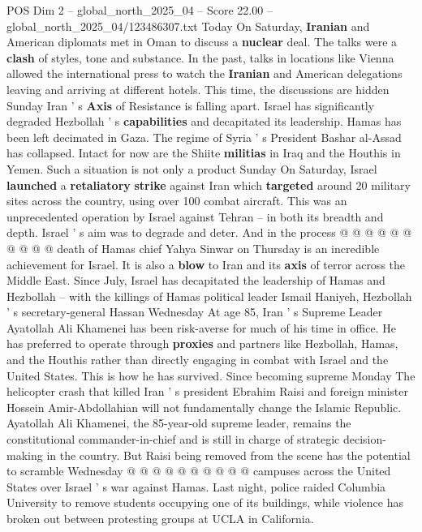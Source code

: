 \begin{textsample}{POS Dim 2 – global\_north\_2025\_04 – Score 22.00 – global\_north\_2025\_04/123486307.txt}  \label{ex:f2_pos_421}
Today On Saturday, \textbf{Iranian} and American diplomats met in Oman to discuss a \textbf{nuclear} deal.
The talks were a \textbf{clash} of styles, tone and substance.
In the past, talks in locations like Vienna allowed the international press to watch the \textbf{Iranian} and American delegations leaving and arriving at different hotels.
This time, the discussions are hidden Sunday Iran ' s \textbf{Axis} of Resistance is falling apart.
Israel has significantly degraded Hezbollah ' s \textbf{capabilities} and decapitated its leadership.
Hamas has been left decimated in Gaza.
The regime of Syria ' s President Bashar al-Assad has collapsed.
Intact for now are the Shiite \textbf{militias} in Iraq and the Houthis in Yemen.
Such a situation is not only a product Sunday On Saturday, Israel \textbf{launched} a \textbf{retaliatory} \textbf{strike} against Iran which \textbf{targeted} around 20 military sites across the country, using over 100 combat aircraft.
This was an unprecedented operation by Israel against Tehran -- in both its breadth and depth.
Israel ' s aim was to degrade and deter.
And in the process @ @ @ @ @ @ @ @ @ @ death of Hamas chief Yahya Sinwar on Thursday is an incredible achievement for Israel.
It is also a \textbf{blow} to Iran and its \textbf{axis} of terror across the Middle East.
Since July, Israel has decapitated the leadership of Hamas and Hezbollah -- with the killings of Hamas political leader Ismail Haniyeh, Hezbollah ' s secretary-general Hassan Wednesday At age 85, Iran ' s Supreme Leader Ayatollah Ali Khamenei has been risk-averse for much of his time in office.
He has preferred to operate through \textbf{proxies} and partners like Hezbollah, Hamas, and the Houthis rather than directly engaging in combat with Israel and the United States.
This is how he has survived.
Since becoming supreme Monday The helicopter crash that killed Iran ' s president Ebrahim Raisi and foreign minister Hossein Amir-Abdollahian will not fundamentally change the Islamic Republic.
Ayatollah Ali Khamenei, the 85-year-old supreme leader, remains the constitutional commander-in-chief and is still in charge of strategic decision-making in the country.
But Raisi being removed from the scene has the potential to scramble Wednesday @ @ @ @ @ @ @ @ @ @ campuses across the United States over Israel ' s war against Hamas.
Last night, police raided Columbia University to remove students occupying one of its buildings, while violence has broken out between protesting groups at UCLA in California.

\end{textsample}

